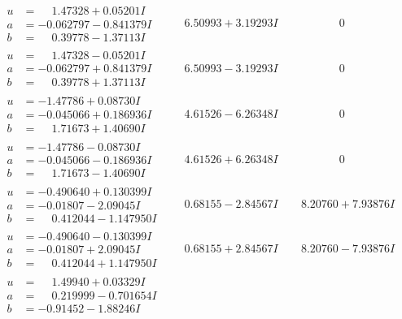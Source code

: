 \documentclass[1p]{elsarticle_modified}
\theoremstyle{definition}
\begin{document}
$$\begin{array}{c|c|c}
\begin{aligned}
u &= \phantom{-}1.47328 + 0.05201 I \\
a &= -0.062797 - 0.841379 I \\
b &= \phantom{-}0.39778 - 1.37113 I\end{aligned}
 & \phantom{-}6.50993 + 3.19293 I & \phantom{-0.000000 } 0 \\ \hline\begin{aligned}
u &= \phantom{-}1.47328 - 0.05201 I \\
a &= -0.062797 + 0.841379 I \\
b &= \phantom{-}0.39778 + 1.37113 I\end{aligned}
 & \phantom{-}6.50993 - 3.19293 I & \phantom{-0.000000 } 0 \\ \hline\begin{aligned}
u &= -1.47786 + 0.08730 I \\
a &= -0.045066 + 0.186936 I \\
b &= \phantom{-}1.71673 + 1.40690 I\end{aligned}
 & \phantom{-}4.61526 - 6.26348 I & \phantom{-0.000000 } 0 \\ \hline\begin{aligned}
u &= -1.47786 - 0.08730 I \\
a &= -0.045066 - 0.186936 I \\
b &= \phantom{-}1.71673 - 1.40690 I\end{aligned}
 & \phantom{-}4.61526 + 6.26348 I & \phantom{-0.000000 } 0 \\ \hline\begin{aligned}
u &= -0.490640 + 0.130399 I \\
a &= -0.01807 - 2.09045 I \\
b &= \phantom{-}0.412044 - 1.147950 I\end{aligned}
 & \phantom{-}0.68155 - 2.84567 I & \phantom{-}8.20760 + 7.93876 I \\ \hline\begin{aligned}
u &= -0.490640 - 0.130399 I \\
a &= -0.01807 + 2.09045 I \\
b &= \phantom{-}0.412044 + 1.147950 I\end{aligned}
 & \phantom{-}0.68155 + 2.84567 I & \phantom{-}8.20760 - 7.93876 I \\ \hline\begin{aligned}
u &= \phantom{-}1.49940 + 0.03329 I \\
a &= \phantom{-}0.219999 - 0.701654 I \\
b &= -0.91452 - 1.88246 I\end{aligned}

\end{array}$$
\end{document}
